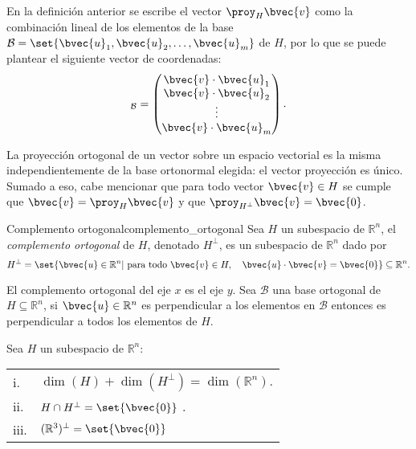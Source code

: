 \documentclass{fmbnotes}
\begin{document}

En la definición anterior se escribe el vector \(\proy_H \bvec{v}\) como la combinación lineal de los elementos de la base \(\mathcal{B}=\set{\bvec{u}_1,\bvec{u}_2,\ldots,\bvec{u}_m}\) de \(H\), por lo que se puede plantear el siguiente vector de coordenadas:
\begin{equation*}
	[\proy_H \bvec{v}]_{\mathcal{B}}=\begin{pmatrix}
		\bvec{v}\cdot\bvec{u}_1 \\ \bvec{v}\cdot\bvec{u}_2 \\ \vdots\\ \bvec{v}\cdot\bvec{u}_m
	\end{pmatrix}.
\end{equation*}

La proyección ortogonal de un vector sobre un espacio vectorial es la misma independientemente de la base ortonormal elegida: el vector proyección es único. Sumado a eso, cabe mencionar que para todo vector \(\bvec{v}\in H\) se cumple que \(\bvec{v}=\proy_{H}\bvec{v}\) y que \(\proy_{H^\perp}\bvec{v}=\bvec{0}\).

\begin{definicion}{Complemento ortogonal}{complemento_ortogonal}
	Sea \(H\) un subespacio de \(\mathbb{R}^{n}\), el \emph{complemento ortogonal} de \(H\), denotado \(H^{\perp}\), es un subespacio de \(\mathbb{R}^{n}\) dado por
	\[H^{\perp}=\set{\bvec{u}\in\mathbb{R}^{n}|\text{ para todo } \bvec{v} \in H,\quad\bvec{u}\cdot \bvec{v}=\bvec{0}}\subseteq\mathbb{R}^{n}.\]
\end{definicion}

El complemento ortogonal del eje \(x\) es el eje \(y\). Sea \(\mathcal{B}\) una base ortogonal de \(H\subseteq\mathbb{R}^{n}\), si \(\bvec{u}\in\mathbb{R}^{n}\) es perpendicular a los elementos en \(\mathcal{B}\) entonces  es perpendicular a todos los elementos de \(H\).

Sea \(H\) un subespacio de \(\mathbb{R}^{n}\):
\begin{longtable}{ll}
	\rule[1ex]{0pt}{2.5ex}i.&\( \dim(H)+\dim(H^\perp)=\dim(\mathbb{R}^{n}) \). \\
	\rule[1ex]{0pt}{2.5ex}ii.&\(H\cap H^\perp=\set{\bvec{0}}\) . \\
	\rule[1ex]{0pt}{2.5ex}iii.&\((\mathbb{R}^{3})^\perp=\set{\bvec{0}}\)
\end{longtable}
\end{document}
